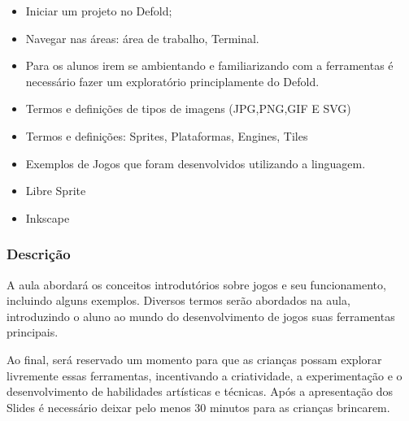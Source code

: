 \documentclass[letterpaper,10pt,brazil]{sphinxmanual}
\begin{document}
\sphinxAtStartPar
{}
\begin{itemize}
\item {} 
\sphinxAtStartPar
Iniciar um projeto no Defold;

\item {} 
\sphinxAtStartPar
Navegar nas áreas: área de trabalho, Terminal.

\item {} 
\sphinxAtStartPar
Para os alunos irem se ambientando e familiarizando com a ferramentas é necessário fazer um exploratório principlamente do Defold.

\end{itemize}

\sphinxAtStartPar
{}
\begin{itemize}
\item {} 
\sphinxAtStartPar
Termos e definições de tipos de imagens (JPG,PNG,GIF E SVG)

\item {} 
\sphinxAtStartPar
Termos e definições: Sprites, Plataformas, Engines, Tiles

\item {} 
\sphinxAtStartPar
Exemplos de Jogos que foram desenvolvidos utilizando a linguagem.

\end{itemize}

\sphinxAtStartPar
{}
\begin{itemize}
\item {} 
\sphinxAtStartPar
Libre Sprite

\item {} 
\sphinxAtStartPar
Inkscape

\end{itemize}
\subsubsection*{Descrição}

\sphinxAtStartPar
A aula abordará os conceitos introdutórios sobre jogos e seu funcionamento,
incluindo alguns exemplos. Diversos termos serão abordados na aula, introduzindo o aluno
ao mundo do desenvolvimento de jogos suas ferramentas principais.

\sphinxAtStartPar
Ao final, será reservado um momento para que as crianças possam explorar livremente essas ferramentas,
incentivando a criatividade, a experimentação e o desenvolvimento de habilidades artísticas e técnicas.
Após a apresentação dos Slides é necessário deixar pelo menos 30 minutos para as crianças brincarem.
\end{document}
